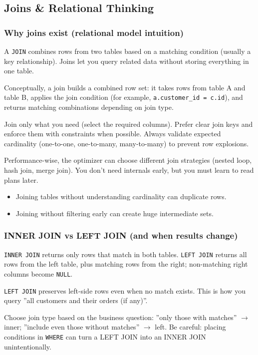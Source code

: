 \subsection{Joins \& Relational Thinking}

\subsubsection{Why joins exist (relational model intuition)}
\J A \texttt{JOIN} combines rows from two tables based on a matching condition (usually a key 
relationship). Joins let you query related data without storing everything in one table.

\M Conceptually, a join builds a combined row set: it takes rows from table A and table B, 
applies the join condition (for example, \texttt{a.customer\_id = c.id}), and returns matching 
combinations depending on join type.

\Sx Join only what you need (select the required columns). Prefer clear join keys and enforce them 
with constraints when possible. Always validate expected cardinality (one-to-one, one-to-many, 
many-to-many) to prevent row explosions.

\E Performance-wise, the optimizer can choose different join strategies (nested loop, hash join, 
merge join). You don't need internals early, but you must learn to read plans later.

\Pitfall
\begin{itemize}
  \item Joining tables without understanding cardinality can duplicate rows.
  \item Joining without filtering early can create huge intermediate sets.
\end{itemize}

\subsubsection{INNER JOIN vs LEFT JOIN (and when results change)}
\J \texttt{INNER JOIN} returns only rows that match in both tables. \texttt{LEFT JOIN} returns 
all rows from the left table, plus matching rows from the right; non-matching right columns become 
\texttt{NULL}.

\M \texttt{LEFT JOIN} preserves left-side rows even when no match exists. This is how you query 
''all customers and their orders (if any)''.

\Sx Choose join type based on the business question: ''only those with matches'' $\rightarrow$ inner; 
''include even those without matches'' $\rightarrow$ left. Be careful: placing conditions in 
\texttt{WHERE} can turn a LEFT JOIN into an INNER JOIN unintentionally.

